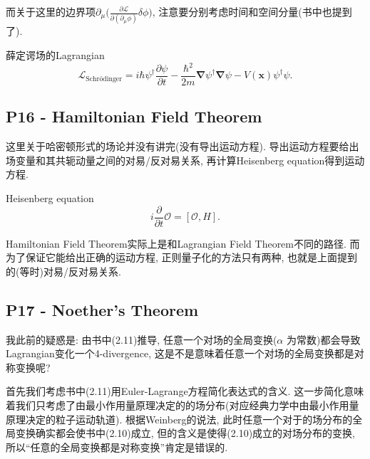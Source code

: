 而关于这里的边界项$\partial_\mu \bigl(\frac{\partial \mathcal{L}}{\partial(\partial_\mu \phi)}\delta \phi \bigr)$, 注意要分别考虑时间和空间分量(书中也提到了).
\begin{mybox}{薛定谔场的Lagrangian}
  \begin{equation}
    \mathcal{L}_\text{Schrödinger} = i\hbar\psi^\dagger\frac{\partial \psi}{\partial t} - \frac{\hbar^2}{2m}\bm{\nabla}\psi^\dagger\bm{\nabla}\psi - V(\mathbf x)\psi^\dagger\psi.
  \end{equation}
\end{mybox}

\subsection{P16 - Hamiltonian Field Theorem}

这里关于哈密顿形式的场论并没有讲完(没有导出运动方程).
导出运动方程要给出场变量和其共轭动量之间的对易/反对易关系, 再计算Heisenberg equation得到运动方程.
\begin{mybox}{Heisenberg equation}
  \begin{equation}
    i\frac{\partial}{\partial t}\mathcal{O} = [\mathcal{O}, H].
  \end{equation}
\end{mybox}


Hamiltonian Field Theorem实际上是和Lagrangian Field Theorem不同的路径.
而为了保证它能给出正确的运动方程, 正则量子化的方法只有两种, 也就是上面提到的(等时)对易/反对易关系.

\subsection{P17 - Noether's Theorem}

我此前的疑惑是: 由书中(2.11)推导, 任意一个对场的全局变换($\alpha$ 为常数)都会导致Lagrangian变化一个4-divergence, 这是不是意味着任意一个对场的全局变换都是对称变换呢?

首先我们考虑书中(2.11)用Euler-Lagrange方程简化表达式的含义.
这一步简化意味着我们只考虑了由最小作用量原理决定的的场分布(对应经典力学中由最小作用量原理决定的粒子运动轨道).
根据Weinberg的说法, 此时任意一个对于的场分布的全局变换确实都会使书中(2.10)成立, 但的含义是使得(2.10)成立的对场分布的变换, 所以“任意的全局变换都是对称变换”肯定是错误的.

